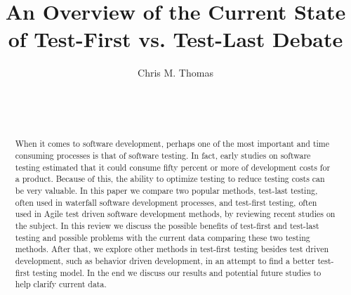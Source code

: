 \documentclass{sig-alternate}
\begin{document}

\title{An Overview of the Current State of Test-First vs. Test-Last Debate}


\author{
\alignauthor
Chris M. Thomas\\
	\\
	\\
	\\
}
\maketitle
\begin{abstract}

When it comes to software development, perhaps one of the most important and time consuming processes is that of software testing. In fact, early studies on software testing estimated that it could consume fifty percent or more of development costs for a product.  Because of this, the ability to optimize testing to reduce testing costs can be very valuable.  In this paper  we compare two popular methods, test-last testing, often used in waterfall software development processes, and test-first testing, often used in Agile test driven software development methods, by reviewing recent studies on the subject.  In this review we discuss the possible benefits of test-first and test-last testing and possible problems with the current data comparing these two testing methods.  After that, we explore other methods in test-first testing besides test driven development, such as behavior driven development, in an attempt to find a better test-first testing model.  In the end we discuss our results and potential future studies to help clarify current data.
\end{abstract}


\end{document}
